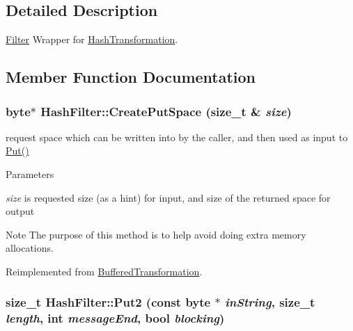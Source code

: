 \subsection{Detailed Description}
\hyperlink{class_filter}{Filter} Wrapper for \hyperlink{class_hash_transformation}{HashTransformation}. 

\subsection{Member Function Documentation}
\hypertarget{class_hash_filter_a5c2f3a90ced66c835969ce1aa235b63e}{
\subsubsection[{CreatePutSpace}]{\setlength{\rightskip}{0pt plus 5cm}byte$\ast$ HashFilter::CreatePutSpace (size\_\-t \& {\em size})}}
\label{class_hash_filter_a5c2f3a90ced66c835969ce1aa235b63e}


request space which can be written into by the caller, and then used as input to \hyperlink{class_buffered_transformation_ae70658b0d271f8e114ac6c3cc9774ede}{Put()} 
\begin{DoxyParams}{Parameters}
\item[{\em size}]is requested size (as a hint) for input, and size of the returned space for output\end{DoxyParams}
\begin{DoxyNote}{Note}
The purpose of this method is to help avoid doing extra memory allocations. 
\end{DoxyNote}


Reimplemented from \hyperlink{class_buffered_transformation_af390325c959c3d6a2c03a447d6cd469d}{BufferedTransformation}.\hypertarget{class_hash_filter_a297dcb6efcd23ad55d90136ccc18c73b}{
\subsubsection[{Put2}]{\setlength{\rightskip}{0pt plus 5cm}size\_\-t HashFilter::Put2 (const byte $\ast$ {\em inString}, \/  size\_\-t {\em length}, \/  int {\em messageEnd}, \/  bool {\em blocking})}}
\label{class_hash_filter_a297dcb6efcd23ad55d90136ccc18c73b}


